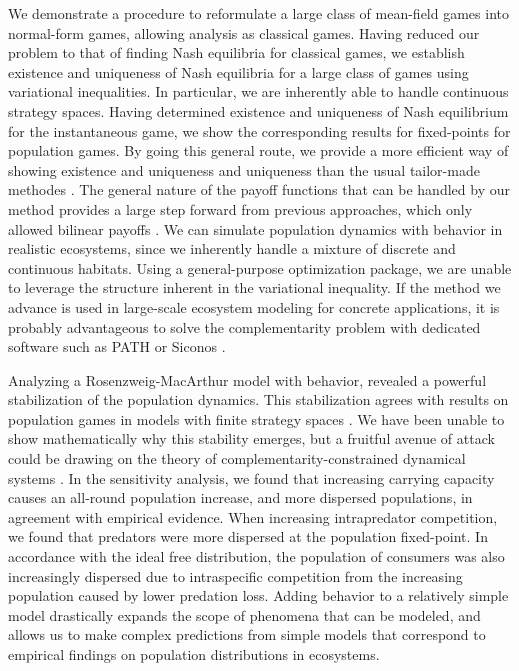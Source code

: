 We demonstrate a procedure to reformulate a large class of mean-field games into normal-form games, allowing analysis as classical games. Having reduced our problem to that of finding Nash equilibria for classical games, we establish existence and uniqueness of Nash equilibria for a large class of games using variational inequalities. In particular, we are inherently able to handle continuous strategy spaces. Having determined existence and uniqueness of Nash equilibrium for the instantaneous game, we show the corresponding results for fixed-points for population games. By going this general route, we provide a more efficient way of showing existence and uniqueness and uniqueness than the usual tailor-made methodes \citep{cressman2010ideal,kvrivan2009evolutionary}. The general nature of the payoff functions that can be handled by our method provides a large step forward from previous approaches, which only allowed bilinear payoffs \citep{mariani2016migration, pinti2021co}. We can simulate population dynamics with behavior in realistic ecosystems, since we inherently handle a mixture of discrete and continuous habitats. Using a general-purpose optimization package, we are unable to leverage the structure inherent in the variational inequality. If the method we advance is used in large-scale ecosystem modeling for concrete applications, it is probably advantageous to solve the complementarity problem with dedicated software such as PATH or Siconos \citep{dirkse1995path, acary2019introduction}.



Analyzing a Rosenzweig-MacArthur model with behavior, revealed a powerful stabilization of the population dynamics. This stabilization agrees with results on population games in models with finite strategy spaces \citep{kvrivan2007lotka, valdovinos2010consequences}. We have been unable to show mathematically why this stability emerges, but a fruitful avenue of attack could be drawing on the theory of complementarity-constrained dynamical systems \citep{adly2018variational,brogliato2020dynamical}.  In the sensitivity analysis, we found that increasing carrying capacity causes an all-round population increase, and more dispersed populations, in agreement with empirical evidence. When increasing intrapredator competition, we found that predators were more dispersed at the population fixed-point. In accordance with the ideal free distribution, the population of consumers was also increasingly dispersed due to intraspecific competition from the increasing population caused by lower predation loss. Adding behavior to a relatively simple model drastically expands the scope of phenomena that can be modeled, and allows us to make complex predictions from simple models that correspond to empirical findings on population distributions in ecosystems.



